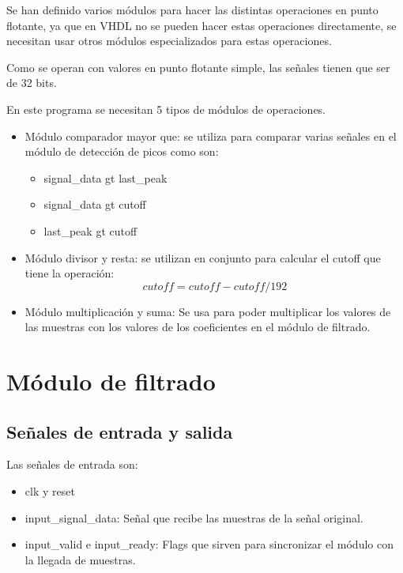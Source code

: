 Se han definido varios módulos para hacer las distintas operaciones en punto flotante, ya que en VHDL no se
pueden hacer estas operaciones directamente, se necesitan usar otros módulos especializados para estas operaciones.

Como se operan con valores en punto flotante simple, las señales tienen que ser de 32 bits.

En este programa se necesitan 5 tipos de módulos de operaciones.

\begin{itemize}
    \item Módulo comparador mayor que: se utiliza para comparar varias señales en el módulo de detección de picos como son:
    \begin{itemize}
        \item signal\_data gt last\_peak
        \item signal\_data gt cutoff
        \item last\_peak gt cutoff
    \end{itemize}

    \item Módulo divisor y resta: se utilizan en conjunto para calcular el cutoff que tiene la operación:
    \[cutoff = cutoff - cutoff/192\]

    \item Módulo multiplicación y suma: Se usa para poder multiplicar los valores de las muestras con los valores de los coeficientes en el módulo de filtrado.
    
\end{itemize}

\section{Módulo de filtrado}

\subsection{Señales de entrada y salida}

Las señales de entrada son:

\begin{itemize}
\item clk y reset
\item input\_signal\_data: Señal que recibe las muestras de la señal original.
\item input\_valid e input\_ready: Flags que sirven para sincronizar el módulo con la llegada de muestras. 
\end{itemize}

